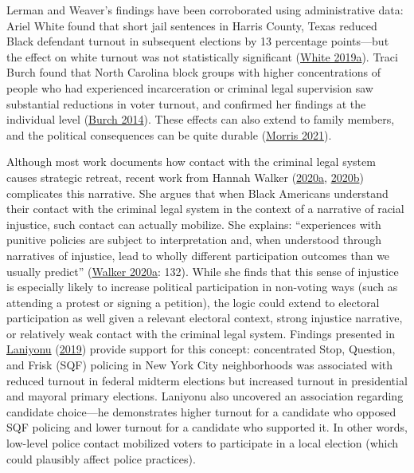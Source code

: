 \documentclass[
  12pt,
]{article}
\begin{document}
Lerman and Weaver's findings have been corroborated using administrative data: Ariel White found that short jail sentences in Harris County, Texas reduced Black defendant turnout in subsequent elections by 13 percentage points---but the effect on white turnout was not statistically significant (\protect\hyperlink{ref-White2019}{White 2019a}). Traci Burch found that North Carolina block groups with higher concentrations of people who had experienced incarceration or criminal legal supervision saw substantial reductions in voter turnout, and confirmed her findings at the individual level (\protect\hyperlink{ref-Burch2014}{Burch 2014}). These effects can also extend to family members, and the political consequences can be quite durable (\protect\hyperlink{ref-Morris2021}{Morris 2021}).

Although most work documents how contact with the criminal legal system causes strategic retreat, recent work from Hannah Walker (\protect\hyperlink{ref-Walker2020}{2020a}, \protect\hyperlink{ref-Walker2020a}{2020b}) complicates this narrative. She argues that when Black Americans understand their contact with the criminal legal system in the context of a narrative of racial injustice, such contact can actually mobilize. She explains: ``experiences with punitive policies are subject to interpretation and, when understood through narratives of injustice, lead to wholly different participation outcomes than we usually predict'' (\protect\hyperlink{ref-Walker2020}{Walker 2020a}: 132). While she finds that this sense of injustice is especially likely to increase political participation in non-voting ways (such as attending a protest or signing a petition), the logic could extend to electoral participation as well given a relevant electoral context, strong injustice narrative, or relatively weak contact with the criminal legal system. Findings presented in \protect\hyperlink{ref-Laniyonu2019}{Laniyonu} (\protect\hyperlink{ref-Laniyonu2019}{2019}) provide support for this concept: concentrated Stop, Question, and Frisk (SQF) policing in New York City neighborhoods was associated with reduced turnout in federal midterm elections but increased turnout in presidential and mayoral primary elections. Laniyonu also uncovered an association regarding candidate choice---he demonstrates higher turnout for a candidate who opposed SQF policing and lower turnout for a candidate who supported it. In other words, low-level police contact mobilized voters to participate in a local election (which could plausibly affect police practices).
\end{document}
